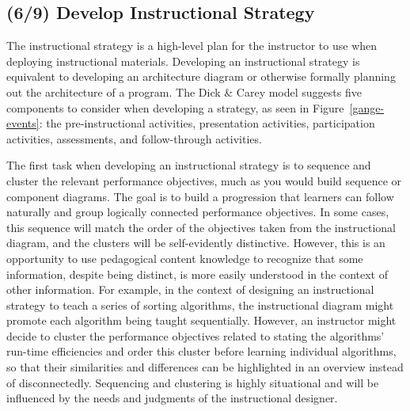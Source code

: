\subsection{(6/9) Develop Instructional Strategy}

The instructional strategy is a high-level plan for the instructor to use when deploying instructional materials. 
Developing an instructional strategy is equivalent to developing an architecture diagram or otherwise formally planning out the architecture of a program.
The Dick \& Carey model suggests five components to consider when developing a strategy, as seen in Figure~\ref{gange-events}: the pre-instructional activities, presentation activities, participation activities, assessments, and follow-through activities.

The first task when developing an instructional strategy is to sequence and cluster the relevant performance objectives, much as you would build sequence or component diagrams.
The goal is to build a progression that learners can follow naturally and group logically connected performance objectives.
In some cases, this sequence will match the order of the objectives taken from the instructional diagram, and the clusters will be self-evidently distinctive.
However, this is an opportunity to use pedagogical content knowledge to recognize that some information, despite being distinct, is more easily understood in the context of other information.
For example, in the context of designing an instructional strategy to teach a series of sorting algorithms, the instructional diagram might promote each algorithm being taught sequentially.
However, an instructor might decide to cluster the performance objectives related to stating the algorithms' run-time efficiencies and order this cluster  before learning individual algorithms, so that their similarities and differences can be highlighted in an overview instead of disconnectedly.
Sequencing and clustering is highly situational and will be influenced by the needs and judgments of the instructional designer.


